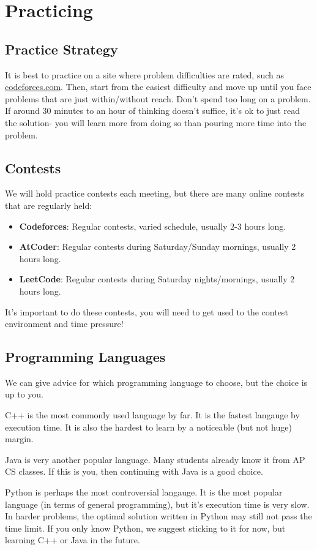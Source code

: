 \documentclass{article}
\begin{document}
\section{Practicing}
\subsection{Practice Strategy}
It is best to practice on a site where problem difficulties are rated, such as \url{codeforces.com}. Then, start from the easiest difficulty and move up until you face problems that are just within/without reach. Don't spend too long on a problem. If around 30 minutes to an hour of thinking doesn't suffice, it's ok to just read the solution- you will learn more from doing so than pouring more time into the problem.
\subsection{Contests}
We will hold practice contests each meeting, but there are many online contests that are regularly held:
\begin{itemize}
    \item \textbf{Codeforces}: Regular contests, varied schedule, usually 2-3 hours long.
    \item \textbf{AtCoder}: Regular contests during Saturday/Sunday mornings, usually 2 hours long.
    \item \textbf{LeetCode}: Regular contests during Saturday nights/mornings, usually 2 hours long.
\end{itemize}
It's important to do these contests, you will need to get used to the contest environment and time pressure!
\subsection{Programming Languages}
We can give advice for which programming language to choose, but the choice is up to you.

C++ is the most commonly used language by far. It is the fastest langauge by execution time. It is also the hardest to learn by a noticeable (but not huge) margin.

Java is very another popular language. Many students already know it from AP CS classes. If this is you, then continuing with Java is a good choice.

Python is perhaps the most controversial langauge. It is the most popular language (in terms of general programming), but it's execution time is very slow. In harder problems, the optimal solution written in Python may still not pass the time limit. If you only know Python, we suggest sticking to it for now, but learning C++ or Java in the future.
\end{document}
